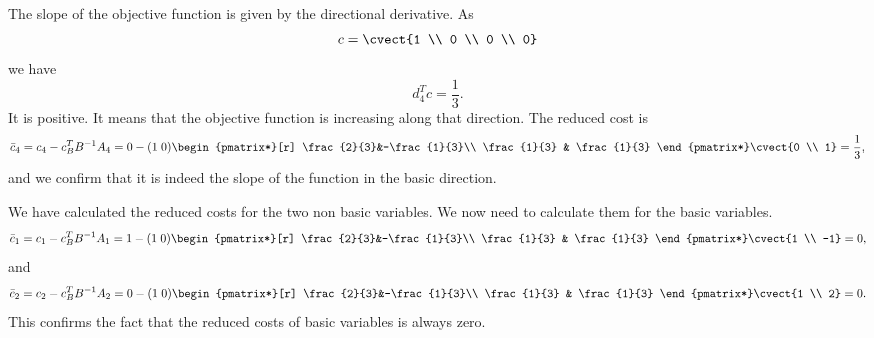 \begin{center}
\end{center}

The slope of the objective function is given by the directional
derivative. As
\[
c = \cvect{1 \\ 0 \\ 0 \\ 0}
\]
we have
\[
d_4^T c = \frac{1}{3}.
\]
It is positive. It means that the objective function is increasing
along that direction.
The reduced cost is
\[
\bar{c}_4 = c_4 - c_B^T B^{-1} A_4 = 0 - (1 \; 0) \begin{pmatrix*}[r]
  \frac{2}{3}&-\frac{1}{3}\\
  \frac{1}{3} & \frac{1}{3}
\end{pmatrix*} \cvect{0 \\ 1} = \frac{1}{3},
\]
and we confirm that it is indeed the slope of the function in the
basic direction.

We have calculated the reduced costs for the two non basic
variables. We now need to calculate them for the basic variables.
\[
\bar{c}_1 = c_1 - c_B^T B^{-1} A_1 = 1 - (1 \; 0) \begin{pmatrix*}[r]
  \frac{2}{3}&-\frac{1}{3}\\
  \frac{1}{3} & \frac{1}{3}
\end{pmatrix*} \cvect{1 \\ -1} = 0,
\]
and
\[
\bar{c}_2 = c_2 - c_B^T B^{-1} A_2 = 0 - (1 \; 0) \begin{pmatrix*}[r]
  \frac{2}{3}&-\frac{1}{3}\\
  \frac{1}{3} & \frac{1}{3}
\end{pmatrix*} \cvect{1 \\ 2} = 0.
\]
This confirms the fact that the reduced costs of basic variables is
always zero.
